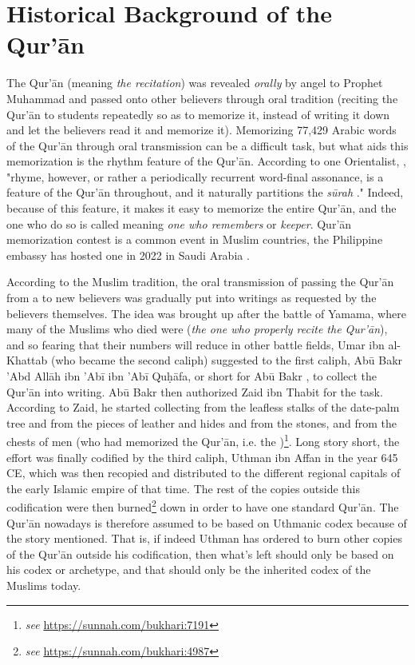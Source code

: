 \chapter{Historical Background of the Qur'\=an}\label{ch:quran_history}

The Qur'\=an (meaning \textit{the recitation}) was revealed \textit{orally} by angel   to Prophet Muhammad  and passed onto other believers through oral tradition (reciting the Qur'\=an to students repeatedly so as to memorize it, instead of writing it down and let the believers read it and memorize it). Memorizing 77,429 Arabic words of the Qur'\=an through oral transmission can be a difficult task, but what aids this memorization is the rhythm feature of the Qur'\=an. According to one Orientalist, , "rhyme, however, or rather a periodically recurrent word-final assonance, is a feature of the Qur'\=an throughout, and it naturally partitions the \textit{s\=urah} ." Indeed, because of this feature, it makes it easy to memorize the entire Qur'\=an, and the one who do so is called   meaning \textit{one who remembers} or \textit{keeper}. Qur'\=an memorization contest is a common event in Muslim countries, the Philippine embassy has hosted one in 2022 in Saudi Arabia \cite{mb2022}.

According to the Muslim tradition, the oral transmission of passing the Qur'\=an from a   to new believers was gradually put into writings as requested by the believers themselves. The idea was brought up after the battle of Yamama, where many of the Muslims who died were   (\textit{the one who properly recite the Qur'\=an}), and so fearing that their numbers will reduce in other battle fields, Umar ibn al-Khattab  (who became the second caliph) suggested to the first caliph, Ab\=u Bakr 'Abd All\=ah ibn 'Ab\=i ibn 'Ab\=i Qu\d{h}\=afa,  or short for Ab\=u Bakr , to collect the Qur'\=an into writing. Ab\=u Bakr then authorized Zaid ibn Thabit  for the task. According to Zaid, he started collecting from the leafless stalks of the date-palm tree and from the pieces of leather and hides and from the stones, and from the chests of men (who had memorized the Qur'\=an, i.e. the  )\footnote{\textit{see} \url{https://sunnah.com/bukhari:7191}}. Long story short, the effort was finally codified by the third caliph, Uthman ibn Affan  in the year 645 CE, which was then recopied and distributed to the different regional capitals of the early Islamic empire of that time. The rest of the copies outside this codification were then burned\footnote{\textit{see} \url{https://sunnah.com/bukhari:4987}} down in order to have one standard Qur'\=an. The Qur'\=an nowadays is therefore assumed to be based on Uthmanic codex because of the story mentioned. That is, if indeed Uthman has ordered to burn other copies of the Qur'\=an outside his codification, then what's left should only be based on his codex or archetype, and that should only be the inherited codex of the Muslims today.

